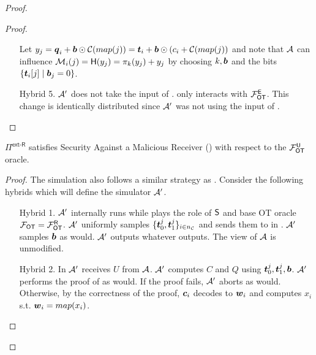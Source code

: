 \begin{proof}
\begin{proof}
\begin{enumerate}[leftmargin=1.8cm]
			Let $y_{j}= \boldsymbol{q}_i+\boldsymbol{b}\odot \mathcal{C}(map(j))=\boldsymbol{t}_i + \boldsymbol{b} \odot (c_i + \mathcal{C}(map(j))$ and note that $\mathcal{A}$ can influence $\mathcal{M}_i(j)=\mathsf{H}(y_j)=\pi_k(y_j)+y_j$ by choosing $k,\boldsymbol{b}$ and the bits $\{\boldsymbol{t}_i[j] \mid \boldsymbol{b}_j=0\}$.
			
			\item[Hybrid 5.] $\mathcal{A}'$ does not take the input of \rec. \rec only interacts with $\mathcal{F}_{\mathsf{OT}}^\mathsf{E}$. This change is identically distributed since $\mathcal{A}'$ was not using the input of \rec.
		\end{enumerate}
	\end{proof}
	

	\begin{claim}\label{claim:ext-R-S-MalReceiver}
		$\Pi^{\textsf{ext-R}}$ satisfies Security Against a Malicious Receiver () with respect to the $\mathcal{F}_{\mathsf{OT}}^\mathsf{U}$ oracle.
	\end{claim}
	\begin{proof}
		The simulation also follows a similar strategy as . Consider the following hybrids which will define the simulator $\mathcal{A}'$. 
		\begin{enumerate}[leftmargin=1.8cm]
			\item[Hybrid 1.] $\mathcal{A}'$ internally runs \Adv while plays the role of $\mathsf{S}$ and base OT oracle $\mathcal{F}_{\mathsf{OT}}=\mathcal{F}_{\mathsf{OT}}^\mathsf{R}$. $\mathcal{A}'$ uniformly samples $\{\boldsymbol{t}^j_0,\boldsymbol{t}^j_1\}_{i\in{n_\mathcal{C}}}$ and sends them to \Adv in . $\mathcal{A}'$ samples $\boldsymbol{b}$ as \send would. $\mathcal{A}'$ outputs whatever \Adv outputs. The view of $\mathcal{A}$ is unmodified.
			
			\item[Hybrid 2.] In  $\mathcal{A}'$ receives $U$ from $\mathcal{A}$.  $\mathcal{A}'$ computes $C$ and $Q$ using $\boldsymbol{t}_0^j,\boldsymbol{t}_1^j,\boldsymbol{b}$. $\mathcal{A}'$ performs the proof of  as \send would. If the proof fails, $\mathcal{A}'$ aborts as \send would. Otherwise, by the correctness of the proof, $\boldsymbol{c}_i$ decodes to $\boldsymbol{w}_i$ and computes $x_i$ s.t. $\boldsymbol{w}_i=map(x_i)$. 
			

\end{enumerate}
\end{proof}
\end{proof}
